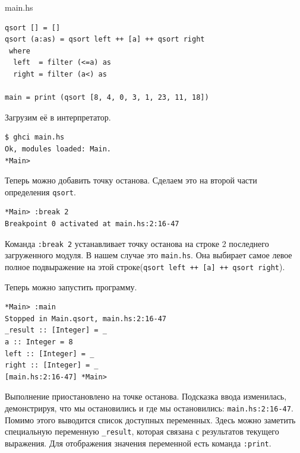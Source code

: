 \documentclass[fontsize=14pt, paper=a4, pagesize, DIV=calc]{scrartcl}
\def\code#1{\texttt{#1}}
\begin{document}
\begin{ListingEnv}
\caption{main.hs}
\begin{lstlisting}
qsort [] = []
qsort (a:as) = qsort left ++ [a] ++ qsort right
 where 
  left  = filter (<=a) as
  right = filter (a<) as

main = print (qsort [8, 4, 0, 3, 1, 23, 11, 18])
\end{lstlisting}
\end{ListingEnv}

Загрузим её в интерпретатор.

\begin{ListingEnv}
\caption{}
\begin{lstlisting}
$ ghci main.hs
Ok, modules loaded: Main.
*Main>
\end{lstlisting}
\end{ListingEnv}

Теперь можно добавить точку останова. Сделаем это на второй части определения
\code{qsort}.

\begin{ListingEnv}
\caption{}
\begin{lstlisting}
*Main> :break 2
Breakpoint 0 activated at main.hs:2:16-47
\end{lstlisting}
\end{ListingEnv}

Команда \code{:break 2} устанавливает точку останова на строке 2 последнего
загруженного модуля. В нашем случае это \code{main.hs}. Она выбирает самое
левое полное подвыражение на этой строке(\code{qsort left ++ [a] ++ qsort
right}).

Теперь можно запустить программу.

\begin{ListingEnv}
\caption{}
\begin{lstlisting}
*Main> :main
Stopped in Main.qsort, main.hs:2:16-47
_result :: [Integer] = _
a :: Integer = 8
left :: [Integer] = _
right :: [Integer] = _
[main.hs:2:16-47] *Main> 
\end{lstlisting}
\end{ListingEnv}

Выполнение приостановлено на точке останова. Подсказка ввода изменилась,
демонстрируя, что мы остановились и где мы остановились:
\code{main.hs:2:16-47}. Помимо этого выводится список доступных переменных.
Здесь можно заметить специальную переменную \code{\_result}, которая связана с
результатов текущего выражения. Для отображения значения переменной есть
команда \code{:print}.
\end{document}
